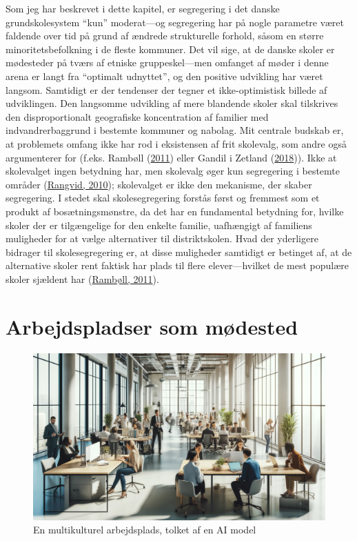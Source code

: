 \documentclass[
]{book}
\begin{document}
Som jeg har beskrevet i dette kapitel, er segregering i det danske grundskolesystem ``kun'' moderat---og segregering har på nogle parametre været faldende over tid på grund af ændrede strukturelle forhold, såsom en større minoritetsbefolkning i de fleste kommuner. Det vil sige, at de danske skoler er mødesteder på tværs af etniske gruppeskel---men omfanget af møder i denne arena er langt fra ``optimalt udnyttet'', og den positive udvikling har været langsom. Samtidigt er der tendenser der tegner et ikke-optimistisk billede af udviklingen. Den langsomme udvikling af mere blandende skoler skal tilskrives den disproportionalt geografiske koncentration af familier med indvandrerbaggrund i bestemte kommuner og nabolag. Mit centrale budskab er, at problemets omfang ikke har rod i eksistensen af frit skolevalg, som andre også argumenterer for (f.eks. Rambøll (\protect\hyperlink{ref-rambuxf8ll2011}{2011}) eller Gandil i Zetland (\protect\hyperlink{ref-zetland2018}{2018})). Ikke at skolevalget ingen betydning har, men skolevalg øger kun segregering i bestemte områder (\protect\hyperlink{ref-rangvid2010}{Rangvid, 2010}); skolevalget er ikke den mekanisme, der skaber segregering. I stedet skal skolesegregering forstås først og fremmest som et produkt af bosætningsmønstre, da det har en fundamental betydning for, hvilke skoler der er tilgængelige for den enkelte familie, uafhængigt af familiens muligheder for at vælge alternativer til distriktskolen. Hvad der yderligere bidrager til skolesegregering er, at disse muligheder samtidigt er betinget af, at de alternative skoler rent faktisk har plads til flere elever---hvilket de mest populære skoler sjældent har (\protect\hyperlink{ref-rambuxf8ll2011}{Rambøll, 2011}).

\hypertarget{kap4}{%
\chapter{Arbejdspladser som mødested}\label{kap4}}

\begin{figure}
\includegraphics[width=24.89in]{images/dalle-work} \caption{En multikulturel arbejdsplads, tolket af en AI model}\label{fig:fig-work}
\end{figure}
\end{document}
